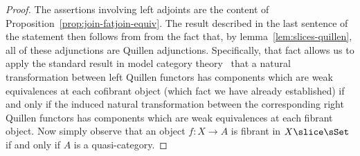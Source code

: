   \begin{proof}
    The assertions involving left adjoints are the content of Proposition~\ref{prop:join-fatjoin-equiv}. The result described in the last sentence of the statement then follows from from the fact that, by lemma~\ref{lem:slices-quillen}, all of these adjunctions are Quillen adjunctions. Specifically, that fact allows us to apply the standard result in model category theory~\cite[1.4.4]{Hovey:1999fk} that a natural transformation between left Quillen functors has components which are weak equivalences at each cofibrant object (which fact we have already established) if and only if the  induced natural transformation between the corresponding right Quillen functors has components which are weak equivalences at each fibrant object. Now simply observe that an object $f\colon X\to A$ is fibrant in $X\slice\sSet$ if and only if $A$ is a quasi-category.
  \end{proof}
  

